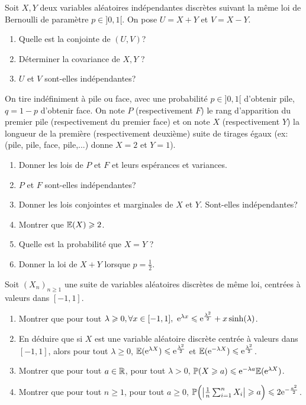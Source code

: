 \begin{exercise}
	Soit $X,Y$ deux variables aléatoires indépendantes discrètes suivant la même
	loi de Bernoulli de paramètre $p\in]0,1[$. On pose $U=X+Y$ et $V=X-Y$.
	\begin{enumerate}
		\item
		Quelle est la conjointe de $(U,V)$?
		\item
		Déterminer la covariance de $X,Y$ ?
		\item
		$U$ et $V$ sont-elles indépendantes?
	\end{enumerate}
\end{exercise}

\begin{exercise}
	On tire indéfiniment à pile ou face, avec une probabilité $p\in]0,1[$
	d'obtenir pile, $q=1-p$ d'obtenir face. On note $P$ (respectivement $F$) le
	rang d'apparition du premier pile (respectivement du premier face) et on note
	$X$ (respectivement $Y$) la longueur de la première (respectivement deuxième)
	suite de tirages égaux (ex: (pile, pile, face, pile,...) donne $X=2$ et
	$Y=1$).
	\begin{enumerate}
		\item
		Donner les lois de $P$ et $F$ et leurs espérances et variances.
		\item
		$P$ et $F$ sont-elles indépendantes?
		\item
		Donner les lois conjointes et marginales de $X$ et $Y$. Sont-elles
		indépendantes?
		\item
		Montrer que $\mathbb{E}(X)\geqslant2$.
		\item
		Quelle est la probabilité que $X=Y$ ?
		\item
		Donner la loi de $X+Y$ lorsque $p=\frac{1}{2}$.
	\end{enumerate}
\end{exercise}

\begin{exercise}
	Soit $(X_{n})_{n\geqslant1}$ une suite de variables aléatoires discrètes de même loi, centrées à valeurs dans $[-1,1]$.
	\begin{enumerate}
		\item
		Montrer que pour tout $\lambda\geqslant0,\forall x\in[-1,1],~\mathrm{e}^{\lambda
		x}\leqslant \mathrm{e}^{\frac{\lambda^{2}}{2}}+x\sinh(\lambda)$.
		\item
		En déduire que si $X$ est une variable aléatoire discrète centrée à
		valeurs dans $[-1,1]$, alors pour tout $\lambda\geqslant0$, $\mathbb{E}(\mathrm{e}^{\lambda
		X})\leqslant \mathrm{e}^{\frac{\lambda^{2}}{2}}$ et $\mathbb{E}(\mathrm{e}^{-\lambda X})\leqslant
		\mathrm{e}^{\frac{\lambda^{2}}{2}}$.
		\item
		Montrer que pour tout $a\in\mathbb{R}$, pour tout $\lambda>0$, $\mathbb{P}(X\geqslant
		a)\leqslant \mathrm{e}^{-\lambda a}\mathbb{E}(\mathrm{e}^{\lambda X})$.
		\item
		Montrer que pour tout $n\geqslant1$, pour tout $a\geqslant0$,
		$\mathbb{P}\Bigl(\bigl\vert\frac{1}{n}\sum_{i=1}^{n}X_{i}\bigr\vert\geqslant
		a\Bigr)\leqslant2\mathrm{e}^{-\frac{a^{2}}{2}}$.
	\end{enumerate}
\end{exercise}

